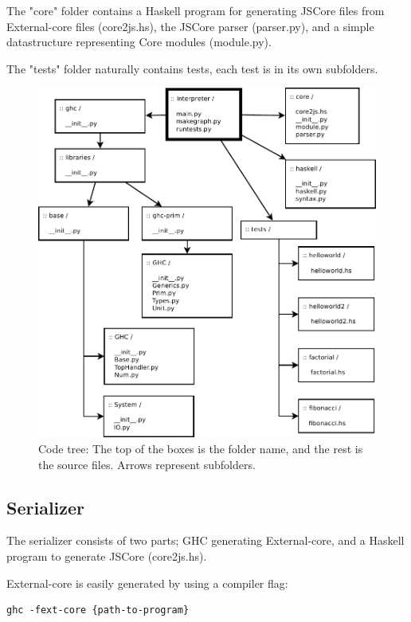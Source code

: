 The "core" folder contains a Haskell program for generating JSCore files from External-core files
(core2js.hs), the JSCore parser (parser.py), and a simple datastructure representing Core modules
(module.py).

The "tests" folder naturally contains tests, each test is in its own subfolders.

\begin{figure}[H]
\centering
\includegraphics[width=\textwidth]{diags/organization}
\caption[Code tree: organization]{Code tree: The top of the boxes is the folder name, 
and the rest is the source files. Arrows represent subfolders.}
\label{organization}
\end{figure}

\subsection{Serializer}

The serializer consists of two parts; GHC generating External-core, and 
a Haskell program to generate JSCore (core2js.hs).

External-core is easily generated by using a compiler flag:
\begin{lstlisting}
ghc -fext-core {path-to-program}
\end{lstlisting}


